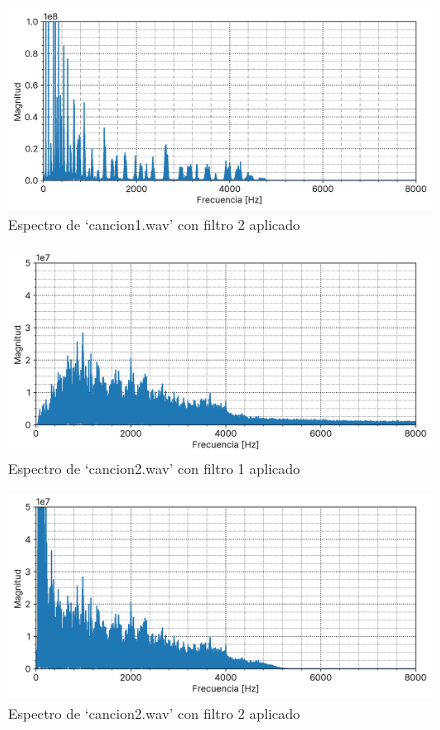 \documentclass[12pt]{article}
\begin{document}
\begin{figure}[H]
\centering
\includegraphics{plot/cancion1_filter2_output_fft.png}
\caption{Espectro de `cancion1.wav' con filtro 2 aplicado}
\label{cancion1_filter2_output_fft}
\end{figure}

\begin{figure}[H]
\centering
\includegraphics{plot/cancion2_filter1_output_fft.png}
\caption{Espectro de `cancion2.wav' con filtro 1 aplicado}
\label{cancion2_filter1_output_fft}
\end{figure}

\begin{figure}[H]
\centering
\includegraphics{plot/cancion2_filter2_output_fft.png}
\caption{Espectro de `cancion2.wav' con filtro 2 aplicado}
\label{cancion2_filter2_output_fft}
\end{figure}
\end{document}
